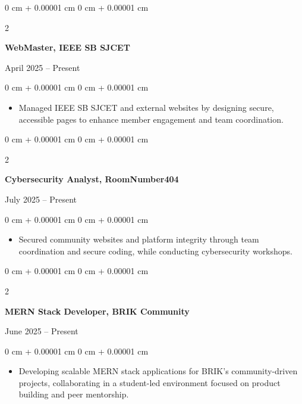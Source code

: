 \documentclass[10pt, a4paper]{article}
\newenvironment{highlights}{
    \begin{itemize}[
        topsep=0.10 cm,
        parsep=0.10 cm,
        partopsep=0pt,
        itemsep=0pt,
        leftmargin=0 cm + 10pt
    ]
}{
    \end{itemize}
} %
\newenvironment{onecolentry}{
    \begin{adjustwidth}{
        0 cm + 0.00001 cm
    }{
        0 cm + 0.00001 cm
    }
}{
    \end{adjustwidth}
} %
\newenvironment{twocolentry}[2][]{
    \onecolentry
    \def\secondColumn{#2}
    \setcolumnwidth{\fill, 4.5 cm}
    \begin{paracol}{2}
}{
    \switchcolumn \raggedleft \secondColumn
    \end{paracol}
    \endonecolentry
} %
\begin{document}
\begin{twocolentry}{
    April 2025 – Present
}
    \textbf{WebMaster, IEEE SB SJCET}
\end{twocolentry}

\vspace{0.10 cm}
\begin{onecolentry}
    \begin{highlights}
        \item Managed IEEE SB SJCET and external websites by designing secure, accessible pages to enhance member engagement and team coordination.
    \end{highlights}
\end{onecolentry}

    \vspace{0.2 cm}

\begin{twocolentry}{
    July 2025 – Present
}
    \textbf{Cybersecurity Analyst, RoomNumber404}
\end{twocolentry}

\vspace{0.10 cm}
\begin{onecolentry}
    \begin{highlights}
        \item Secured community websites and platform integrity through team coordination and secure coding, while conducting cybersecurity workshops.
    \end{highlights}
\end{onecolentry}

    \vspace{0.2 cm}
    
\begin{twocolentry}{
    June 2025 – Present 
}
    \textbf{MERN Stack Developer, BRIK Community}
\end{twocolentry}

\vspace{0.10 cm}
\begin{onecolentry}
    \begin{highlights}
        \item Developing scalable MERN stack applications for BRIK’s community-driven projects, collaborating in a student-led environment focused on product building and peer mentorship.
    \end{highlights}
\end{onecolentry}

\vspace{0.2 cm}
\end{document}
